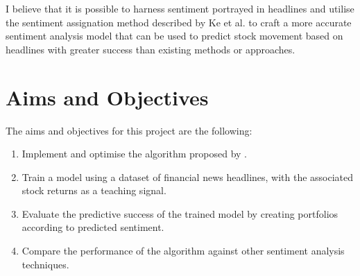I believe that it is possible to harness sentiment portrayed in headlines and utilise the sentiment assignation method described by Ke et al. to craft a more accurate sentiment analysis model that can be used to predict stock movement based on headlines with greater success than existing methods or approaches.

\section{Aims and Objectives}
The aims and objectives for this project are the following:
\begin{enumerate}
\item Implement and optimise the algorithm proposed by \cite{sestm}.
\item Train a model using a dataset of financial news headlines, with the associated stock returns as a teaching signal.
\item Evaluate the predictive success of the trained model by creating portfolios according to predicted sentiment.
\item Compare the performance of the algorithm against other sentiment analysis techniques.
\end{enumerate}



 

